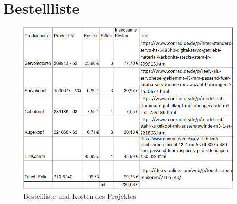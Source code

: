 \documentclass[12pt,a4paper,bibliography=totoc,listof=totoc]{scrartcl}
\begin{document}
\section {Bestellliste}

\begin{figure}[htbp]
	\centering
	\includegraphics[scale = 0.8]{pics/Bestelliste}
	\caption{Bestellliste und Kosten des Projektes}
	\label{fig:bestell}
\end{figure}
\pagebreak
\end{document}
